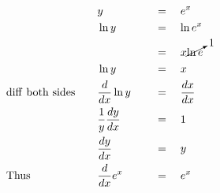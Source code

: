 \begin{alignat*}{5}
&\,&&y\quad&&\,=\quad e^x\\
&\,&&\ln{y}\quad&&\,=\quad\ln{e^x}\\
&\,&&\,\quad&&\,=\quad x\cancelto{1}{\ln{e}}\\
&\,&&\ln{y}\quad&&\,=\quad x\\
&\mathrm{diff~both~sides}\quad&&\frac{d}{dx}\ln{y}\quad&&\,=\quad \frac{dx}{dx}\\
&\,&&\frac{1}{y}\frac{dy}{dx}\quad&&\,=\quad1\\
&\,&&\frac{dy}{dx}\quad&&\,=\quad y\\
&\mathrm{Thus}\quad&&\frac{d}{dx}e^x\quad&&\,=\quad e^x
\end{alignat*}
